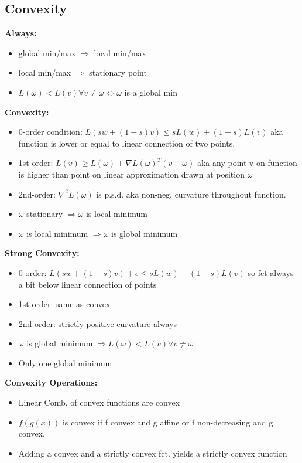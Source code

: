 \subsection{Convexity}

\textbf{Always:}
\begin{itemize}
    \item global min/max $\Rightarrow$ local min/max
    \item local min/max $\Rightarrow$ stationary point
    \item $L(\omega) < L(v) \forall v\neq \omega \Leftrightarrow \omega$ is a global min
\end{itemize}
\textbf{Convexity:}
\begin{itemize}
    \item 0-order condition: $L(sw + (1-s)v) \leq sL(w) + (1-s)L(v)$
    aka function is lower or equal to linear connection of two points.
    \item 1st-order: $L(v) \geq L(\omega) + \nabla L(\omega)^T(v-\omega)$ aka any point v on function is higher than point on linear approximation drawn at position $\omega$
    \item 2nd-order: $\nabla^2 L(\omega)$ is p.s.d. aka non-neg. curvature throughout function.
    \item $\omega$ stationary $\Rightarrow \omega$ is local minimum 
    \item $\omega$ is local minimum $\Rightarrow \omega$ is global minimum
\end{itemize}
\textbf{Strong Convexity:}
\begin{itemize}
    \item 0-order: $L(sw + (1-s)v) + \epsilon \leq sL(w) + (1-s)L(v)$ so fct always a bit below linear connection of points
    \item 1st-order: same as convex
    \item 2nd-order: strictly positive curvature always
    \item $\omega$ is global minimum $\Rightarrow L(\omega) < L(v) \forall v\neq \omega$ 
    \item Only one global minimum
\end{itemize}
\textbf{Convexity Operations:}
\begin{itemize}
    \item Linear Comb. of convex functions are convex
    \item $f(g(x))$ is convex if f convex and g affine or f non-decreasing and g convex.
    \item Adding a convex and a strictly convex fct. yields a strictly convex function
\end{itemize}